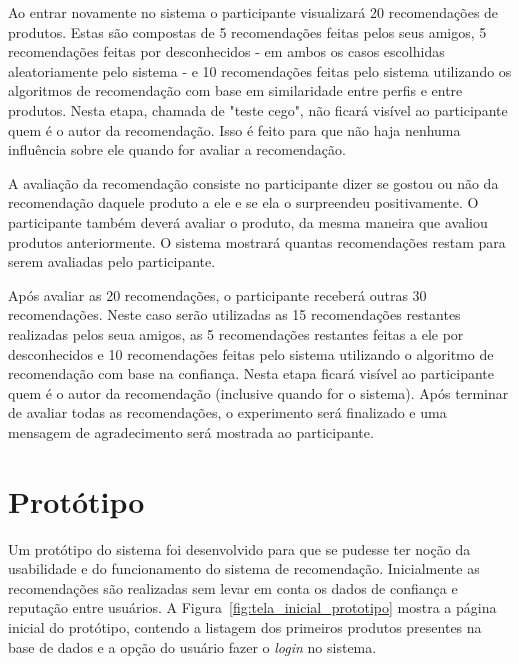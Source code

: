  Ao entrar novamente no sistema o participante visualizará 20 recomendações de produtos. Estas são compostas de 5 recomendações feitas pelos seus amigos, 5 recomendações feitas por desconhecidos - em ambos os casos escolhidas aleatoriamente pelo sistema - e 10 recomendações feitas pelo sistema utilizando os algoritmos de recomendação com base em similaridade entre perfis e entre produtos. Nesta etapa, chamada de "teste cego", não ficará visível ao participante quem é o autor da recomendação. Isso é feito para que não haja nenhuma influência sobre ele quando for avaliar a recomendação.
 
 A avaliação da recomendação consiste no participante dizer se gostou ou não da recomendação daquele produto a ele e se ela o surpreendeu positivamente. O participante também deverá avaliar o produto, da mesma maneira que avaliou produtos anteriormente. O sistema mostrará quantas recomendações restam para serem avaliadas pelo participante.
 
 Após avaliar as 20 recomendações, o participante receberá outras 30 recomendações. Neste caso serão utilizadas as 15 recomendações restantes realizadas pelos seua amigos, as 5 recomendações restantes feitas a ele por desconhecidos e 10 recomendações feitas pelo sistema utilizando o algoritmo de recomendação com base na confiança. Nesta etapa ficará visível ao participante quem é o autor da recomendação (inclusive quando for o sistema). Após terminar de avaliar todas as recomendações, o experimento será finalizado e uma mensagem de agradecimento será mostrada ao participante.
 
 \section{Protótipo}
 \label{cha:prototipo}

 Um protótipo do sistema foi desenvolvido para que se pudesse ter noção da usabilidade e do funcionamento do sistema de recomendação. Inicialmente as recomendações são realizadas sem levar em conta os dados de confiança e reputação entre usuários. A Figura~\ref{fig:tela_inicial_prototipo} mostra a página inicial do protótipo, contendo a listagem dos primeiros produtos presentes na base de dados e a opção do usuário fazer o \textit{login} no sistema.
 
